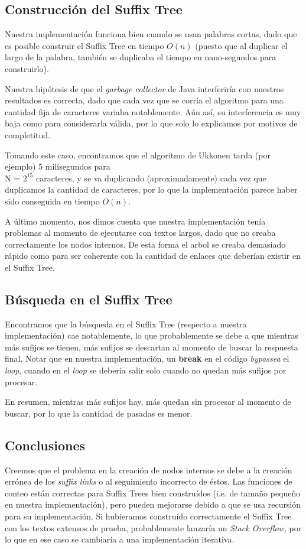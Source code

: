 \documentclass[letterpaper,10pt]{article}
\begin{document}
	\subsection{Construcción del Suffix Tree}

	Nuestra implementación funciona bien cuando se usan palabras cortas, dado que es posible construir el Suffix Tree en tiempo $O(n)$ (puesto que al duplicar el largo de la palabra,
	también se duplicaba el tiempo en nano-segundos para construirlo).

	Nuestra hipótesis de que el \textit{garbage collector} de Java interferiría con nuestros resultados es correcta, dado que cada vez que se corría el algoritmo para una
	cantidad fija de caracteres variaba notablemente. Aún así, su interferencia es muy baja como para considerarla válida, por lo que solo lo explicamos por motivos de completitud.

	Tomando este caso, encontramos que el algoritmo de Ukkonen tarda (por ejemplo) 5 milisegundos para \\N = $2^{15}$ caracteres, y se va duplicando (aproximadamente) cada vez que duplicamos
	la cantidad de caracteres, por lo que la implementación parece haber sido conseguida en tiempo $O(n)$.

	A último momento, nos dimos cuenta que nuestra implementación tenía problemas al momento de ejecutarse con textos largos, dado que no creaba correctamente los nodos internos.
	De esta forma el arbol se creaba demasiado rápido como para ser coherente con la cantidad de enlaces que deberían existir en el Suffix Tree.

	\subsection{Búsqueda en el Suffix Tree}

	Encontramos que la búsqueda en el Suffix Tree (respecto a nuestra implementación) cae notablemente, lo que probablemente se debe a que mientras más sufijos se tienen, más sufijos se
	descartan al momento de buscar la respuesta final. Notar que en nuestra implementación, un \textbf{break} en el código \textit{bypassea} el \textit{loop}, cuando en el \textit{loop}
	se debería salir solo cuando no quedan más sufijos por procesar.

	En resumen, mientras más sufijos hay, más quedan sin procesar al momento de buscar, por lo que la cantidad de pasadas es menor.

	\subsection{Conclusiones}

	Creemos que el problema en la creación de nodos internos se debe a la creación errónea de los \textit{suffix links} o al seguimiento incorrecto de éstos.
	Las funciones de conteo están correctas para Suffix Trees bien construídos (i.e. de tamaño pequeño en nuestra implementación), pero pueden mejorarse debido a que se usa recursión para
	su implementación. Si hubieramos construído correctamente el Suffix Tree con los textos extensos de prueba, probablemente lanzaría un \textit{Stack Overflow}, por lo que en ese caso
	se cambiaría a una implementación iterativa.
\end{document}
